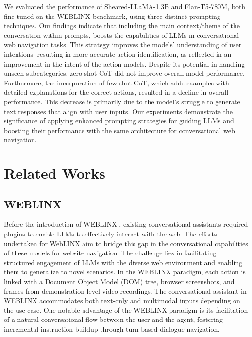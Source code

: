 \documentclass[11pt]{article}
\begin{document}
We evaluated the performance of Sheared-LLaMA-1.3B and Flan-T5-780M, both fine-tuned on the WEBLINX benchmark, using three distinct prompting techniques. Our findings indicate that including the main context/theme of the conversation within prompts, boosts the capabilities of LLMs in conversational web navigation tasks. This strategy improves the models' understanding of user intentions, resulting in more accurate action identification, as reflected in an improvement in the intent of the action models. Despite its potential in handling unseen subcategories, zero-shot CoT did not improve overall model performance. Furthermore, the incorporation of few-shot CoT, which adds examples with detailed explanations for the correct actions, resulted in a decline in overall performance. This decrease is primarily due to the model's struggle to generate text responses that align with user inputs. Our experiments demonstrate the significance of applying enhanced prompting strategies for guiding LLMs and boosting their performance with the same architecture for conversational web navigation.
\section{Related Works}

\subsection{WEBLINX}

Before the introduction of WEBLINX \cite{lxinghan_2024_weblinx}, existing conversational assistants required plugins to enable LLMs to effectively interact with the web. The efforts undertaken for WebLINX aim to bridge this gap in the conversational capabilities of these models for website navigation. The challenge lies in facilitating structured engagement of LLMs with the diverse web environment and enabling them to generalize to novel scenarios. In the WEBLINX paradigm, each action is linked with a Document Object Model (DOM) tree, browser screenshots, and frames from demonstration-level video recordings. The conversational assistant in WEBLINX accommodates both text-only and multimodal inputs depending on the use case. One notable advantage of the WEBLINX paradigm is its facilitation of a natural conversational flow between the user and the agent, fostering incremental instruction buildup through turn-based dialogue navigation.
\end{document}
